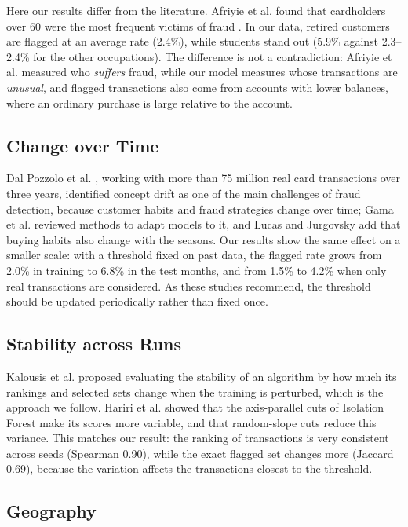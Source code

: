 \documentclass[journal]{IEEEtran}
\begin{document}
Here our results differ from the literature. Afriyie et al. found that cardholders over 60 were the most frequent victims of fraud \cite{afriyie2023supervised}. In our data, retired customers are flagged at an average rate (2.4\%), while students stand out (5.9\% against 2.3--2.4\% for the other occupations). The difference is not a contradiction: Afriyie et al. measured who \emph{suffers} fraud, while our model measures whose transactions are \emph{unusual}, and flagged transactions also come from accounts with lower balances, where an ordinary purchase is large relative to the account.

\subsection{Change over Time}

Dal Pozzolo et al. \cite{dalpozzolo2018realistic}, working with more than 75 million real card transactions over three years, identified concept drift as one of the main challenges of fraud detection, because customer habits and fraud strategies change over time; Gama et al. \cite{gama2014survey} reviewed methods to adapt models to it, and Lucas and Jurgovsky \cite{lucas2020survey} add that buying habits also change with the seasons. Our results show the same effect on a smaller scale: with a threshold fixed on past data, the flagged rate grows from 2.0\% in training to 6.8\% in the test months, and from 1.5\% to 4.2\% when only real transactions are considered. As these studies recommend, the threshold should be updated periodically rather than fixed once.

\subsection{Stability across Runs}

Kalousis et al. \cite{kalousis2007stability} proposed evaluating the stability of an algorithm by how much its rankings and selected sets change when the training is perturbed, which is the approach we follow. Hariri et al. \cite{hariri2021extended} showed that the axis-parallel cuts of Isolation Forest make its scores more variable, and that random-slope cuts reduce this variance. This matches our result: the ranking of transactions is very consistent across seeds (Spearman 0.90), while the exact flagged set changes more (Jaccard 0.69), because the variation affects the transactions closest to the threshold.

\subsection{Geography}
\end{document}
